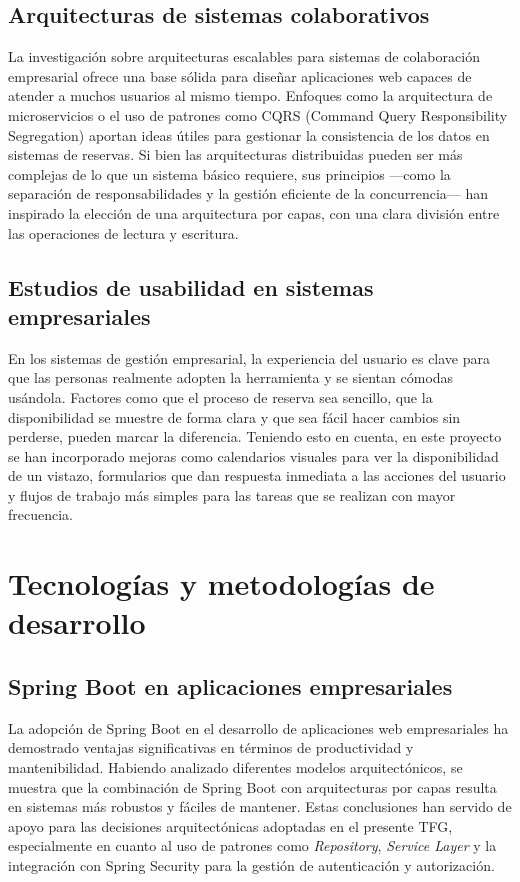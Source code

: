 \subsection{Arquitecturas de sistemas colaborativos}\label{arquitecturas-sistemas-colaborativos}
La investigación sobre arquitecturas escalables para sistemas de colaboración empresarial ofrece una base sólida para diseñar aplicaciones web capaces de atender a muchos usuarios al mismo tiempo. Enfoques como la arquitectura de microservicios o el uso de patrones como CQRS (Command Query Responsibility Segregation) aportan ideas útiles para gestionar la consistencia de los datos en sistemas de reservas.
Si bien las arquitecturas distribuidas pueden ser más complejas de lo que un sistema básico requiere, sus principios —como la separación de responsabilidades y la gestión eficiente de la concurrencia— han inspirado la elección de una arquitectura por capas, con una clara división entre las operaciones de lectura y escritura.\\

\subsection{Estudios de usabilidad en sistemas empresariales}\label{estudios-usuabilidad-sistemas-empresariales}
En los sistemas de gestión empresarial, la experiencia del usuario es clave para que las personas realmente adopten la herramienta y se sientan cómodas usándola. Factores como que el proceso de reserva sea sencillo, que la disponibilidad se muestre de forma clara y que sea fácil hacer cambios sin perderse, pueden marcar la diferencia.
Teniendo esto en cuenta, en este proyecto se han incorporado mejoras como calendarios visuales para ver la disponibilidad de un vistazo, formularios que dan respuesta inmediata a las acciones del usuario y flujos de trabajo más simples para las tareas que se realizan con mayor frecuencia.\\

\section{Tecnologías y metodologías de desarrollo}\label{tecnologias-metodologias-desarrollo}
\subsection{Spring Boot en aplicaciones empresariales}\label{spring-boot-aplicaciones-empresariales}
La adopción de Spring Boot en el desarrollo de aplicaciones web empresariales ha demostrado ventajas significativas en términos de productividad y mantenibilidad. Habiendo analizado diferentes modelos arquitectónicos, se muestra que la combinación de Spring Boot con arquitecturas por capas resulta en sistemas más robustos y fáciles de mantener.
Estas conclusiones han servido de apoyo para las decisiones arquitectónicas adoptadas en el presente TFG, especialmente en cuanto al uso de patrones como \emph{Repository}, \emph{Service Layer} y la integración con Spring Security para la gestión de autenticación y autorización.\\

